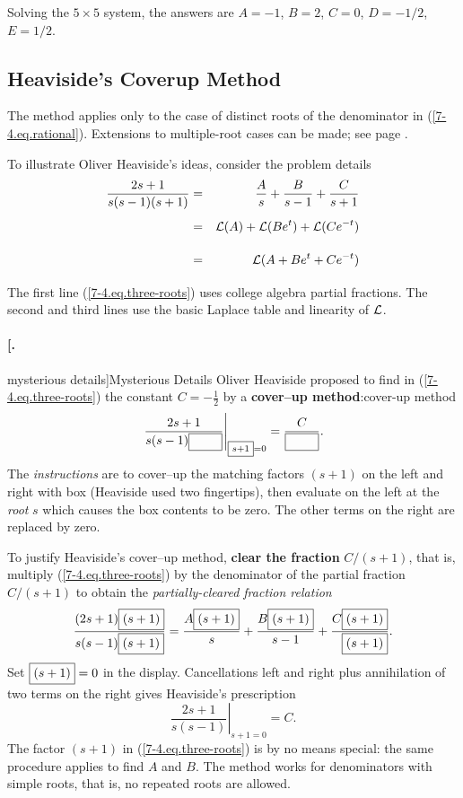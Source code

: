 \documentclass{article}
\def\df{\bfseries}
\def\dd{\displaystyle}
\def\Ll{{\cal L}}
\def\BF#1{{\df #1}}
\def\XX{}
\def\rf#1{(\ref{#1})}
\def\EM#1{{\mdseries\itshape #1}}
\def\Paragraph#1{\paragraph{#1.}}
\begin{document}
Solving the $5\times 5$ system, the answers are $A=-1$, $B=2$,
$C=0$, $D=-1/2$, $E= 1/2$.

%




\subsection{Heaviside's Coverup Method}
The method applies only to the case of distinct roots of the
denominator in \rf{7-4.eq.rational}. Extensions to multiple-root
cases can be made; see page \pageref{7-4.heaviside-multiple}.


To illustrate Oliver Heaviside's ideas, consider the problem details
\def\AA{\fbox{$\scriptstyle\phantom{\scriptstyle (s+1)}$}}%
\def\CC{\fbox{$(s+1)$}}%
\begin{eqnarray}
\label{7-4.eq.three-roots}
\dd\frac{2s+1}{s(s-1)(s+1)} &=&\dd \frac{A}{s}+\frac{B}{s-1}+\frac{C}{s+1}
\\
\nonumber
\phantom{\dd\frac{2s+1}{s(s-1)(s+1)}} &=&\dd \Ll(A)+\Ll(Be^t)+\Ll(Ce^{-t}) \\
\nonumber
\phantom{\dd\frac{2s+1}{s(s-1)(s+1)}} &=&\dd \Ll(A+Be^t+Ce^{-t})
\end{eqnarray}
The first line \rf{7-4.eq.three-roots} uses college algebra
partial fractions. The second and third lines use the basic
Laplace table and linearity of $\Ll$.

\Paragraph[mysterious details]{Mysterious Details} Oliver
Heaviside proposed to find in \rf{7-4.eq.three-roots} the constant
$C=-\frac12$ by a \BF{cover--up method}:\XX{cover-up method}
$$\left.\frac{2s+1}{s(s-1)\AA}\right|_{\fbox{$\scriptstyle s+1$}=0} =
\frac{C}{\AA}.$$ The \EM{instructions} are to cover--up the
matching factors $(s+1)$ on the left and right with box \AA{}
(Heaviside used two fingertips), then evaluate on the left at the
\EM{root} $s$ which causes the box contents to be zero. The other
terms on the right are replaced by zero.

To justify Heaviside's cover--up method,  \BF{clear the fraction}
$C/(s+1)$, that is,  multiply \rf{7-4.eq.three-roots} by the
denominator  of the partial fraction $C/(s+1)$ to
obtain the \EM{partially-cleared fraction relation}
\def\AA{\fbox{$(s+1)$}}
$$\frac{(2s+1)\AA}{s(s-1)\AA} =
\frac{A\AA}{s}+\frac{B\AA}{s-1}+\frac{C\AA}{\phantom{C}\AA}.$$ Set
$\AA=0$ in the display. Cancellations left and right plus
annihilation of two terms on the right gives Heaviside's
prescription
$$\left.\frac{2s+1}{s(s-1)}\right|_{s+1=0} =
C.$$
The factor $(s+1)$ in \rf{7-4.eq.three-roots} is by no means special:
the same procedure applies to find $A$ and $B$. The method works for
denominators with simple roots, that is, no repeated roots are allowed.
\end{document}
